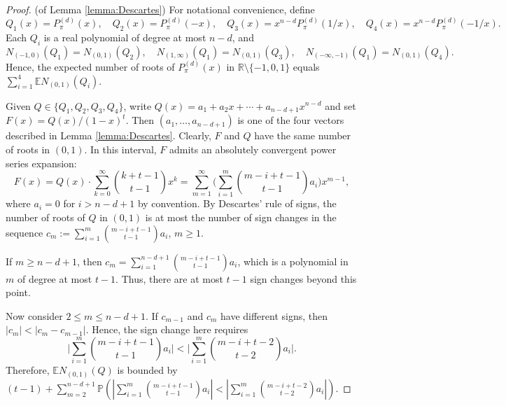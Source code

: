 \documentclass[reqno]{amsart}
\newcommand\R{{\mathbb{R}}}
\renewcommand\P{{\mathbb{P}}}
\newcommand\E{{\mathbb{E}}}
\theoremstyle{plain}
\theoremstyle{definition}
\begin{document}
\begin{proof}(of Lemma \ref{lemma:Descartes}) For notational convenience, define 
\[
Q_{1}(x)=P_{\pi}^{(d)}(x), \quad Q_2(x)=P_{\pi}^{(d)}(-x), \quad Q_3(x)=x^{n-d}P_{\pi}^{(d)}(1/x), \quad Q_4(x)=x^{n-d}P_{\pi}^{(d)}(-1/x).
\]
Each $Q_{i}$ is a real polynomial of degree at most $n-d$, and  
$$
N_{(-1,0)}(Q_{1})=N_{(0,1)}(Q_{2}), \quad N_{(1,\infty)}(Q_{1})=N_{(0,1)}(Q_{3}), \quad N_{(-\infty,-1)}(Q_{1})=N_{(0,1)}(Q_{4}).
$$
Hence, the expected number of roots of $P_{\pi}^{(d)}(x)$ in $\R\setminus\{-1,0,1\}$ equals $\sum_{i=1}^{4}\E N_{(0,1)} (Q_{i})$.

Given $Q\in \{Q_{1},Q_{2},Q_{3},Q_{4}\}$, write $Q(x)=a_1+a_2x+\cdots+a_{n-d+1}x^{n-d}$ and set $F(x) = Q(x)/(1-x)^t$. Then $(a_1,\ldots,a_{n-d+1})$ is one of the four vectors described in Lemma \ref{lemma:Descartes}. 
Clearly, $F$ and $Q$ have the same number of roots in $(0,1)$. In this interval, $F$ admits an absolutely convergent power series expansion:
$$
F(x)=Q(x)\cdot\sum_{k=0}^{\infty} \binom{k+t-1}{t-1} x^{k}= \sum_{m=1}^{\infty} \Big(\sum_{i=1}^{m} \binom{m-i+t-1}{t-1} a_{i} \Big) x^{m-1},
$$
where $a_{i} = 0$ for $i > n-d+1$ by convention. 
By Descartes' rule of signs, the number of roots of $Q$ in $(0,1)$ is at most the number of sign changes in the sequence $c_{m}:=\sum_{i=1}^{m} \binom{m-i+t-1}{t-1} a_{i}$, $m\ge 1$.

If $m \ge n-d+1$, then $c_{m}=\sum_{i=1}^{n-d+1} \binom{m-i+t-1}{t-1} a_{i}$, which is a polynomial in $m$ of degree at most $t-1$. Thus, there are at most $t-1$ sign changes beyond this point. 

Now consider $2\le m \le n-d+1$. If $c_{m-1}$ and $c_{m}$ have different signs, then 
$|c_{m}|<|c_{m}-c_{m-1}|$. Hence, the sign change here requires
\[
\Big| \sum_{i=1}^{m} \binom{m-i+t-1}{t-1} a_{i} \Big|<\Big| \sum_{i=1}^{m} \binom{m-i+t-2}{t-2} a_{i} \Big|.
\]
Therefore, $\E N_{(0,1)}(Q)$ is bounded by
$(t-1)+\sum_{m=2}^{n-d+1} \P(| \sum_{i=1}^{m} \binom{m-i+t-1}{t-1} a_{i}|<| \sum_{i=1}^{m} \binom{m-i+t-2}{t-2} a_{i}|)$.
\end{proof}
\end{document}
